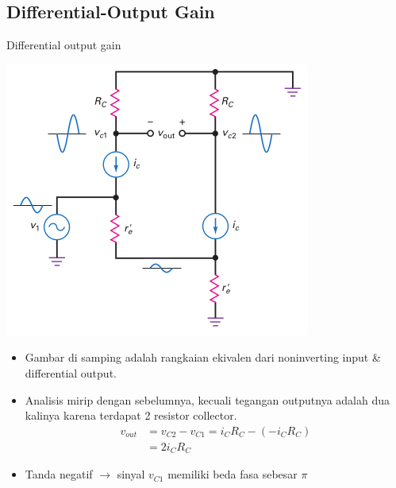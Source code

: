 \documentclass[aspectratio=169]{beamer}
\begin{document}
\subsection{Differential-Output Gain}
\begin{frame}{Differential output gain}
	\begin{multicols}{2}
		\begin{center}
			\includegraphics[height=0.7\textheight]{gambar/01.noninverting_input_and_differential_output}
		\end{center}
		\columnbreak
		\begin{itemize}
			\item Gambar di samping adalah rangkaian ekivalen dari noninverting input \& differential output.
			\item Analisis mirip dengan sebelumnya, kecuali tegangan outputnya adalah dua kalinya karena terdapat 2 resistor collector.
			\begin{align*}
				v_{out} &= v_{C2} - v_{C1} = i_C R_C - (-i_C R_C) \\
				&= 2 i_C R_C
			\end{align*}
			\item Tanda negatif $ \rightarrow $ sinyal $ v_{C1} $ memiliki beda fasa sebesar $ \pi $
		\end{itemize}
	\end{multicols}
\end{frame}
\end{document}
